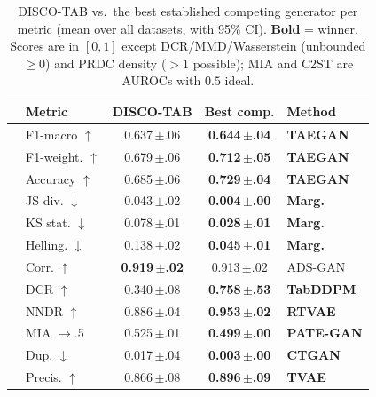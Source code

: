 \begin{table}[t]\centering\small
\setlength{\tabcolsep}{4pt}\renewcommand{\arraystretch}{1.1}
\caption{DISCO-TAB vs.\ the best established competing generator per metric (mean over all datasets, with 95\% CI). \textbf{Bold} = winner. Scores are in $[0,1]$ except DCR/MMD/Wasserstein (unbounded $\geq 0$) and PRDC density ($>1$ possible); MIA and C2ST are AUROCs with $0.5$ ideal.}
\label{tab:vsbest}
\begin{tabular}{@{}clccl@{}}
\toprule
& \textbf{Metric} & \textbf{DISCO-TAB} & \textbf{Best comp.} & \textbf{Method} \\
\midrule
{} & F1-macro $\uparrow$ & 0.637\,{\tiny$\pm$.06} & \textbf{0.644\,{\tiny$\pm$.04}} & \textbf{TAEGAN} \\
 & F1-weight. $\uparrow$ & 0.679\,{\tiny$\pm$.06} & \textbf{0.712\,{\tiny$\pm$.05}} & \textbf{TAEGAN} \\
 & Accuracy $\uparrow$ & 0.685\,{\tiny$\pm$.06} & \textbf{0.729\,{\tiny$\pm$.04}} & \textbf{TAEGAN} \\
\midrule
{} & JS div. $\downarrow$ & 0.043\,{\tiny$\pm$.02} & \textbf{0.004\,{\tiny$\pm$.00}} & \textbf{Marg.} \\
 & KS stat. $\downarrow$ & 0.078\,{\tiny$\pm$.01} & \textbf{0.028\,{\tiny$\pm$.01}} & \textbf{Marg.} \\
 & Helling. $\downarrow$ & 0.138\,{\tiny$\pm$.02} & \textbf{0.045\,{\tiny$\pm$.01}} & \textbf{Marg.} \\
 & Corr. $\uparrow$ & \textbf{0.919\,{\tiny$\pm$.02}} & 0.913\,{\tiny$\pm$.02} & ADS-GAN \\
\midrule
{} & DCR $\uparrow$ & 0.340\,{\tiny$\pm$.08} & \textbf{0.758\,{\tiny$\pm$.53}} & \textbf{TabDDPM} \\
 & NNDR $\uparrow$ & 0.886\,{\tiny$\pm$.04} & \textbf{0.953\,{\tiny$\pm$.02}} & \textbf{RTVAE} \\
 & MIA $\to$.5 & 0.525\,{\tiny$\pm$.01} & \textbf{0.499\,{\tiny$\pm$.00}} & \textbf{PATE-GAN} \\
 & Dup. $\downarrow$ & 0.017\,{\tiny$\pm$.04} & \textbf{0.003\,{\tiny$\pm$.00}} & \textbf{CTGAN} \\
\midrule
{} & Precis. $\uparrow$ & 0.866\,{\tiny$\pm$.08} & \textbf{0.896\,{\tiny$\pm$.09}} & \textbf{TVAE} \\

\end{tabular}
\end{table}
